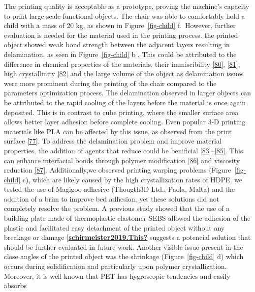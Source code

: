 \documentclass[
]{article}
\begin{document}
The printing quality is acceptable as a prototype, proving the machine's
capacity to print large-scale functional objects. The chair was able to
comfortably hold a child with a mass of 20 kg, as shown in
Figure~\ref{fig-child} f.~However, further evaluation is needed for the
material used in the printing process. the printed object showed weak
bond strength between the adjacent layers resulting in delamination, as
seen in Figure~\ref{fig-child} b . This could be attributed to the
difference in chemical properties of the materials, their immiscibility
\protect\hyperlink{ref-chu2022}{{[}80{]}},
\protect\hyperlink{ref-william2021}{{[}81{]}}, high crystallinity
\protect\hyperlink{ref-verma2023}{{[}82{]}} and the large volume of the
object as delamination issues were more prominent during the printing of
the chair compared to the parameters optimization process. The
delamination observed in larger objects can be attributed to the rapid
cooling of the layers before the material is once again deposited. This
is in contrast to cube printing, where the smaller surface area allows
better layer adhesion before complete cooling. Even popular 3-D printing
materials like PLA can be affected by this issue, as observed from the
print surface \protect\hyperlink{ref-wijnen2018}{{[}77{]}}. To address
the delamination problem and improve material properties, the addition
of agents that reduce could be benificial
\protect\hyperlink{ref-kramer1994}{{[}83{]}}--\protect\hyperlink{ref-inoya2012}{{[}85{]}}.
This can enhance interfacial bonds through polymer modification
\protect\hyperlink{ref-gao2021}{{[}86{]}} and viscosity reduction
\protect\hyperlink{ref-ko2019}{{[}87{]}}. Additionally,we observed
printing warping problems (Figure~\ref{fig-child} c), which are likely
caused by the high crystallization rates of HDPE. we tested the use of
Magigoo adhesive (Thougth3D Ltd., Paola, Malta) and the addition of a
brim to improve bed adhesion, yet these solutions did not completely
resolve the problem. A previous study showed that the use of a building
plate made of thermoplastic elastomer SEBS allowed the adhesion of the
plastic and facilitated easy detachment of the printed object without
any breakage or damage
{[}\protect\hyperlink{ref-schirmeister2019.This}{\textbf{schirmeister2019.This?}}
suggests a potencial solution that should be further evaluated in future
work. Another visible issue present in the close angles of the printed
object was the shrinkage (Figure~\ref{fig-child} d) which occurs during
solidification and particularly upon polymer crystallization. Moreover,
it is well-known that PET has hygroscopic tendencies and easily absorbs
\end{document}
